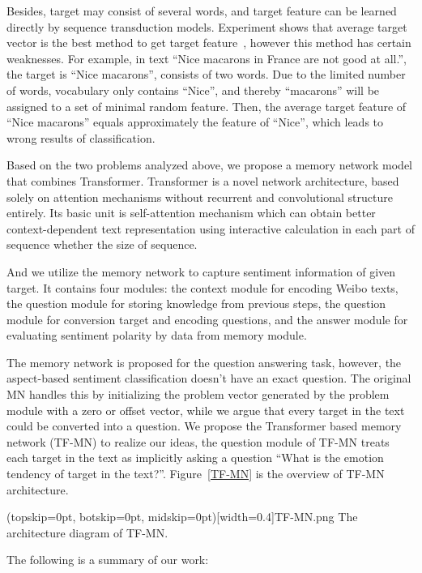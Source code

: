 \documentclass{ieeeaccess}
\begin{document}
Besides, target may consist of several words, and target feature can be learned directly by sequence transduction models. Experiment shows that average target vector is the best method to get target feature~\cite{DBLP:journals/eswa/DoPMA19}, however this method has certain weaknesses. For example, in text “Nice macarons in France are not good at all.”, the target is “Nice macarons”, consists of two words. Due to the limited number of words, vocabulary only contains “Nice”, and thereby “macarons” will be assigned to a set of minimal random feature. Then, the average target feature of “Nice macarons” equals approximately the feature of “Nice”, which leads to wrong results of classification.

Based on the two problems analyzed above, we propose a memory network model that combines Transformer. Transformer is a novel network architecture, based solely on attention mechanisms without recurrent and convolutional structure entirely. Its basic unit is self-attention mechanism which can obtain better context-dependent text representation using interactive calculation in each part of sequence whether the size of sequence.

And we utilize the memory network to capture sentiment information of given target. It contains four modules: the context module for encoding Weibo texts, the question module for storing knowledge from previous steps, the question module for conversion target and encoding questions, and the answer module for evaluating sentiment polarity by data from memory module.

The memory network is proposed for the question answering task, however, the aspect-based sentiment classification doesn’t have an exact question. The original MN handles this by initializing the problem vector generated by the problem module with a zero or offset vector, while we argue that every target in the text could be converted into a question. We propose the Transformer based memory network (TF-MN) to realize our ideas, the question module of TF-MN treats each target in the text as implicitly asking a question “What is the emotion tendency of target in the text?”. Figure~\ref{TF-MN} is the overview of TF-MN architecture.

\Figure[htb!](topskip=0pt, botskip=0pt, midskip=0pt)[width=0.4\textwidth]{TF-MN.png}
{The architecture diagram of TF-MN.}\label{TF-MN}

The following is a summary of our work:
 
\end{document}
